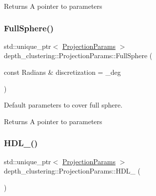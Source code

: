 \begin{DoxyReturn}{Returns}
A pointer to parameters 
\end{DoxyReturn}
\mbox{\label{classdepth__clustering_1_1ProjectionParams_aa61906911995f0501dd03746b96d4c9c}} 
\subsubsection{\texorpdfstring{Full\+Sphere()}{FullSphere()}}
{\footnotesize\ttfamily std\+::unique\+\_\+ptr$<$ \hyperlink{classdepth__clustering_1_1ProjectionParams}{Projection\+Params} $>$ depth\+\_\+clustering\+::\+Projection\+Params\+::\+Full\+Sphere (\begin{DoxyParamCaption}\item[{const Radians \&}]{discretization = {\+\_\+deg} }\end{DoxyParamCaption})\hspace{0.3cm}{\ttfamily [static]}}



Default parameters to cover full sphere. 

\begin{DoxyReturn}{Returns}
A pointer to parameters 
\end{DoxyReturn}
\mbox{\label{classdepth__clustering_1_1ProjectionParams_a38a76a0e0f00f8f1b95b6108641703d6}} 
\subsubsection{\texorpdfstring{H\+D\+L\+\_()}{HDL\_32()}}
{\footnotesize\ttfamily std\+::unique\+\_\+ptr$<$ \hyperlink{classdepth__clustering_1_1ProjectionParams}{Projection\+Params} $>$ depth\+\_\+clustering\+::\+Projection\+Params\+::\+H\+D\+L\+\_ (\begin{DoxyParamCaption}{ }\end{DoxyParamCaption})\hspace{0.3cm}{\ttfamily [static]}}



